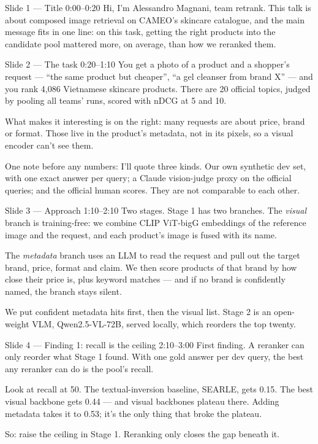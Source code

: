 \documentclass[11pt]{article}
\begin{document}
\begin{say}{Slide 1 --- Title \hfill 0:00--0:20}
Hi, I'm Alessandro Magnani, team retrank. This talk is about composed image retrieval on
CAMEO's skincare catalogue, and the main message fits in one line: on this task, getting the
right products into the candidate pool mattered more, on average, than how we reranked them.
\end{say}

\begin{say}{Slide 2 --- The task \hfill 0:20--1:10}
You get a photo of a product and a shopper's request --- ``the same product but cheaper'',
``a gel cleanser from brand X'' --- and you rank 4,086 Vietnamese skincare products. There
are 20 official topics, judged by pooling all teams' runs, scored with nDCG at 5 and 10.

What makes it interesting is on the right: many requests are about price, brand or
format. Those live in the product's metadata, not in its pixels, so a visual encoder can't
see them.

One note before any numbers: I'll quote three kinds. Our own synthetic dev set, with one
exact answer per query; a Claude vision-judge proxy on the official queries; and the
official human scores. They are not comparable to each other.
\end{say}

\begin{say}{Slide 3 --- Approach \hfill 1:10--2:10}
Two stages. Stage 1 has two branches. The \emph{visual} branch is training-free: we
combine CLIP ViT-bigG embeddings of the reference image and the request, and each product's
image is fused with its name.

The \emph{metadata} branch uses an LLM to read the request and pull out the target brand,
price, format and claim. We then score products of that brand by how close their price is,
plus keyword matches --- and if no brand is confidently named, the branch stays silent.

We put confident metadata hits first, then the visual list. Stage 2 is an open-weight VLM,
Qwen2.5-VL-72B, served locally, which reorders the top twenty.
\end{say}

\begin{say}{Slide 4 --- Finding 1: recall is the ceiling \hfill 2:10--3:00}
First finding. A reranker can only reorder what Stage 1 found. With one gold answer per dev
query, the best any reranker can do is the pool's recall.

Look at recall at 50. The textual-inversion baseline, SEARLE, gets 0.15. The best visual
backbone gets 0.44 --- and visual backbones plateau there. Adding metadata takes it to
0.53; it's the only thing that broke the plateau.

So: raise the ceiling in Stage 1. Reranking only closes the gap beneath it.
\end{say}
\end{document}
